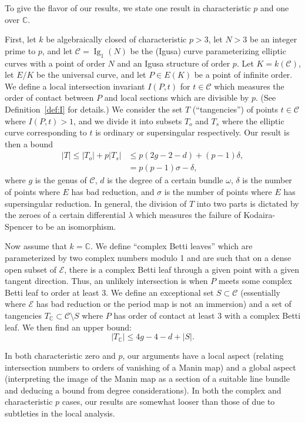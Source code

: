 \documentclass[12pt,reqno]{amsart}
\numberwithin{equation}{section}
\theoremstyle{plain}
\theoremstyle{definition}
\theoremstyle{remark}
\newcommand{\CC}{\mathcal{C}}
\newcommand{\EE}{\mathcal{E}}
\newcommand{\C}{\mathbb{C}}
\newcommand{\<}{\langle}
\renewcommand{\>}{\rangle}
\numberwithin{equation}{section}
\DeclareMathOperator{\Ig}{Ig}
\begin{document}
To give the flavor of our results, we state one result in
characteristic $p$ and one over $\C$.

First, let $k$ be algebraically closed of characteristic $p>3$, let
$N>3$ be an integer prime to $p$, and let $\CC=\Ig_1(N)$ be the
(Igusa) curve parameterizing elliptic curves with a point of order $N$
and an Igusa structure of order $p$.  Let $K=k(\CC)$, let $E/K$ be the
universal curve, and let $P\in E(K)$ be a point of infinite order.  We
define a local intersection invariant $I(P,t)$ for $t\in\CC$ which
measures the order of contact between $P$ and local sections which are
divisible by $p$.  (See Definition~\ref{def:I} for details.)  We
consider the set $T$ (``tangencies'') of points $t\in \CC$ where
$I(P,t)>1$, and we divide it into subsets $T_o$ and $T_s$ where the
elliptic curve corresponding to $t$ is ordinary or supersingular
respectively.  Our result is then a bound
\begin{align*}
      |T|\le |T_o|+p|T_s|&\le p(2g-2-d)+(p-1)\delta,\\
      &=p(p-1)\sigma-\delta,
\end{align*}
where $g$ is the genus of $\CC$, $d$ is the degree of a certain bundle
$\omega$, $\delta$ is the number of points where $E$ has bad
reduction, and $\sigma$ is the number of points where $E$ has
supersingular reduction.  In general, the division of $T$ into two
parts is dictated by the zeroes of a certain differential $\lambda$
which measures the failure of Kodaira-Spencer to be an isomorphism.

Now assume that $k=\C$.  We define ``complex Betti leaves'' which are
parameterized by two complex numbers modulo 1 and are such that on a
dense open subset of $\EE$, there is a complex Betti leaf through a
given point with a given tangent direction.  Thus, an unlikely
intersection is when $P$ meets some complex Betti leaf to order at
least 3.  We define an exceptional set $S\subset\CC$ (essentially
where $\EE$ has bad reduction or the period map is not an immersion)
and a set of tangencies $T_\C\subset\CC\setminus S$ where $P$ has
order of contact at least 3 with a complex Betti leaf.  We then find
an upper bound:
\[|T_\C|\le 4g-4-d+|S|.\]

In both characteristic zero and $p$, our arguments have a local aspect
(relating intersection numbers to orders of vanishing of a Manin map)
and a global aspect (interpreting the image of the Manin map as a
section of a suitable line bundle and deducing a bound from degree
considerations).  In both the complex and characteristic $p$ cases,
our results are somewhat looser than those of \cite{UlmerUrzua21} due
to subtleties in the local analysis.
\end{document}
